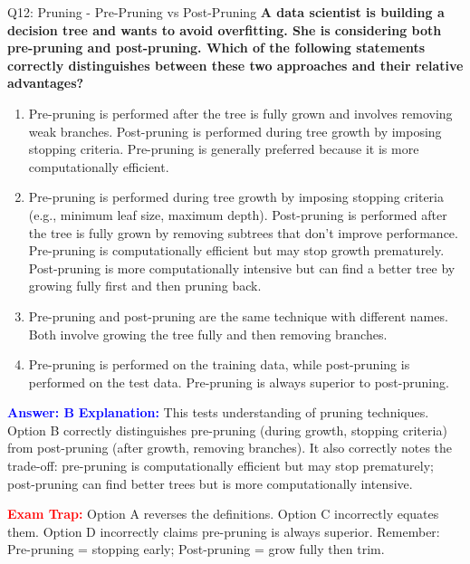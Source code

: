 \documentclass[8pt]{beamer}
\begin{document}
	\begin{frame}{Q12: Pruning - Pre-Pruning vs Post-Pruning}
		\fontsize{6.5}{7.5}\selectfont
		\textbf{A data scientist is building a decision tree and wants to avoid overfitting. She is considering both pre-pruning and post-pruning. Which of the following statements correctly distinguishes between these two approaches and their relative advantages?}
		
		\begin{enumerate}
			\item Pre-pruning is performed after the tree is fully grown and involves removing weak branches. Post-pruning is performed during tree growth by imposing stopping criteria. Pre-pruning is generally preferred because it is more computationally efficient.
			\item Pre-pruning is performed during tree growth by imposing stopping criteria (e.g., minimum leaf size, maximum depth). Post-pruning is performed after the tree is fully grown by removing subtrees that don't improve performance. Pre-pruning is computationally efficient but may stop growth prematurely. Post-pruning is more computationally intensive but can find a better tree by growing fully first and then pruning back.
			\item Pre-pruning and post-pruning are the same technique with different names. Both involve growing the tree fully and then removing branches.
			\item Pre-pruning is performed on the training data, while post-pruning is performed on the test data. Pre-pruning is always superior to post-pruning.
		\end{enumerate}
		
		\vspace{0.1cm}
		\textcolor{blue}{\textbf{Answer: B}}
		\vspace{0.1cm}
		\textcolor{blue}{\textbf{Explanation:}} This tests understanding of pruning techniques. Option B correctly distinguishes pre-pruning (during growth, stopping criteria) from post-pruning (after growth, removing branches). It also correctly notes the trade-off: pre-pruning is computationally efficient but may stop prematurely; post-pruning can find better trees but is more computationally intensive.
		
		\textcolor{red}{\textbf{Exam Trap:}} Option A reverses the definitions. Option C incorrectly equates them. Option D incorrectly claims pre-pruning is always superior. Remember: Pre-pruning = stopping early; Post-pruning = grow fully then trim.
	\end{frame}
	
\end{document}
